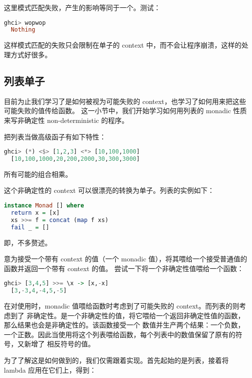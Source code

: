\documentclass[./main.tex]{subfiles}
\begin{document}
这里模式匹配失败，产生的影响等同于一个。测试：

\begin{lstlisting}[language=Haskell]
  ghci> wopwop
  Nothing
\end{lstlisting}

这样模式匹配的失败只会限制在单子的 context 中，而不会让程序崩溃，这样的处理方式好很多。

\subsection*{列表单子}

目前为止我们学习了是如何被视为可能失败的 context，也学习了如何用\acode{>>=}来把这些可能失败的值传给函数。
这一小节中，我们开始学习如何用列表的 monadic 性质来写非确定性 non-deterministic 的程序。

把列表当做高级函子有如下特性：

\begin{lstlisting}[language=Haskell]
  ghci> (*) <$> [1,2,3] <*> [10,100,1000]
  [10,100,1000,20,200,2000,30,300,3000]
\end{lstlisting}

所有可能的组合相乘。

这个非确定性的 context 可以很漂亮的转换为单子。列表的实例如下：

\begin{lstlisting}[language=Haskell]
  instance Monad [] where
  return x = [x]
  xs >>= f = concat (map f xs)
  fail _ = []
\end{lstlisting}

即，不多赘述。

\acode{>>=}意为接受一个带有 context 的值（一个 monadic 值），将其喂给一个接受普通值的函数并返回一个带有 context 的值。
尝试一下将一个非确定性值喂给一个函数：

\begin{lstlisting}[language=Haskell]
  ghci> [3,4,5] >>= \x -> [x,-x]
  [3,-3,4,-4,5,-5]
\end{lstlisting}

在对使用\acode{>>=}时，monadic 值喂给函数时考虑到了可能失败的 context。而列表的\acode{>>=}则考虑到了
非确定性。\acode{[3,4,5]}是一个非确定性的值，将它喂给一个返回非确定性值的函数，那么结果也会是非确定性的。该函数接受一个
数值并生产两个结果：一个负数，一个正数。因此当使用\acode{>>=}将这个列表喂给函数，每个列表中的数值保留了原有的符号，又新增了
相反符号的值。

为了了解这是如何做到的，我们仅需跟着实现。首先起始的是列表\acode{[3,4,5]}，接着将 lambda 应用在它们上，得到：
\end{document}
